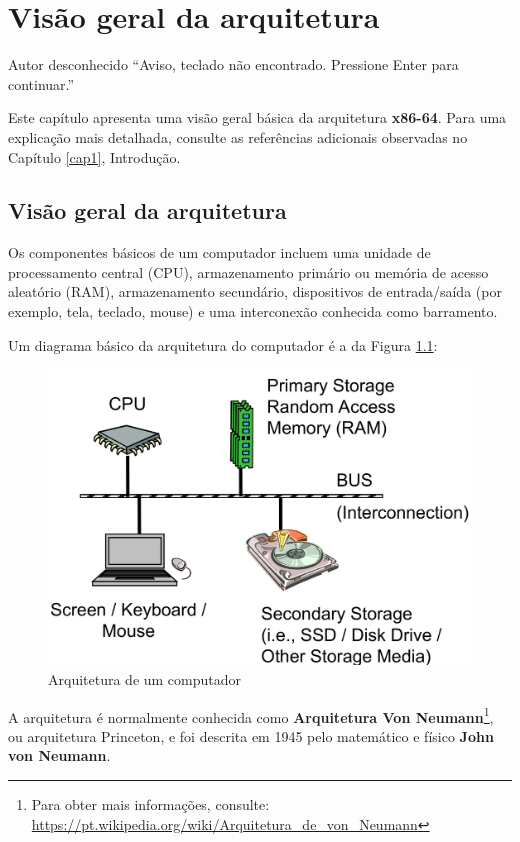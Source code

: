\chapter{Visão geral da arquitetura}

\begin{chapquote}{Autor desconhecido}
``Aviso, teclado não encontrado. Pressione Enter para continuar.''
\end{chapquote}

Este capítulo apresenta uma visão geral básica da arquitetura \textbf{x86-64}. Para uma explicação mais detalhada, consulte as referências adicionais observadas no Capítulo \ref{cap1}, Introdução.

\section{Visão geral da arquitetura}
Os componentes básicos de um computador incluem uma unidade de processamento central (CPU), armazenamento primário ou memória de acesso aleatório (RAM), armazenamento secundário, dispositivos de entrada/saída (por exemplo, tela, teclado, mouse) e uma interconexão conhecida como barramento.

Um diagrama básico da arquitetura do computador é a da Figura \ref{arquiteturacomputador}:
\begin{figure}[ht]
	\includegraphics[width=\linewidth]{imagens/arquitetura}
	\caption{Arquitetura de um computador}
	\label{arquiteturacomputador}
\end{figure}

A arquitetura é normalmente conhecida como \textbf{Arquitetura Von Neumann}\footnote{Para obter mais informações, consulte: \url{https://pt.wikipedia.org/wiki/Arquitetura\_de\_von\_Neumann}}, 
ou arquitetura Princeton, e foi descrita em 1945 pelo matemático e físico \textbf{John von Neumann}.

